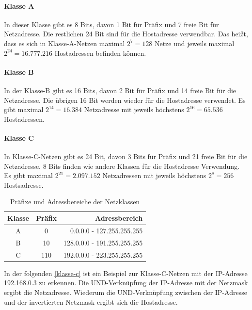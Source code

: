 \paragraph{Klasse A} In dieser Klasse gibt es 8 Bits, davon 1 Bit für Präfix und 7 freie Bit für Netzadresse. Die restlichen 24 Bit sind für die Hostadresse verwendbar. Das heißt, dass es sich in Klasse-A-Netzen maximal $2^7 = 128$ Netze und jeweils maximal $2^{24} = 16.777.216$ Hostadressen befinden können.

\paragraph{Klasse B} In der Klasse-B gibt es 16 Bits, davon 2 Bit für Präfix und 14 freie Bit für die Netzadresse. Die übrigen 16 Bit werden wieder für die Hostadresse verwendet. Es gibt maximal $2^{14} = 16.384$ Netzadresse mit jeweils höchstens $2^{16} = 65.536$ Hostadressen.

\paragraph{Klasse C} In Klasse-C-Netzen gibt es 24 Bit, davon 3 Bits für Präfix und 21 freie Bit für die Netzadresse. 8 Bits finden wie andere Klassen für die Hostadresse Verwendung. Es gibt maximal $2^{21} = 2.097.152$ Netzadressen mit jeweils höchstens $2^8 = 256$ Hostsadresse.

\begin{table}[htbp]
	\centering
	\begin{tabular}{|c|c|r|}\hline
	   Klasse & Präfix & Adressbereich \\ \hline \hline
	   A & 0 & 0.0.0.0 - 127.255.255.255 \\ \hline
	   B & 10 & 128.0.0.0 - 191.255.255.255 \\ \hline
	   C & 110 & 192.0.0.0 - 223.255.255.255 \\ \hline
	 \end{tabular}
	 \caption[Präfixe und Adressbereiche der Netzklassen]{Präfixe und Adressbereiche der Netzklassen \cite{Computernetze:kompakt}}
\end{table}

In der folgenden \autoref{klasse-c} ist ein Beispiel zur Klasse-C-Netzen mit der IP-Adresse 192.168.0.3 zu erkennen. Die UND-Verknüpfung der IP-Adresse mit der Netzmask ergibt die Netzadresse. Wiederum die UND-Verknüpfung zwischen der IP-Adresse und der invertierten Netzmask ergibt sich die Hostadresse. \smallskip \smallskip

